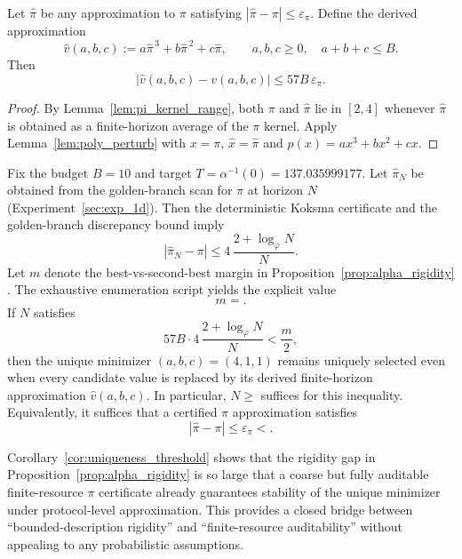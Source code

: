 \begin{corollary}
\label{cor:v_from_pi_certificate}
Let $\widehat\pi$ be any approximation to $\pi$ satisfying $|\widehat\pi-\pi|\le \varepsilon_\pi$.
Define the derived approximation
\[
\widehat v(a,b,c):=a\widehat\pi^{\,3}+b\widehat\pi^{\,2}+c\widehat\pi,
\qquad a,b,c\ge 0,\quad a+b+c\le B.
\]
Then
\[
|\widehat v(a,b,c)-v(a,b,c)|
\le 57B\,\varepsilon_\pi.
\]
\end{corollary}

\begin{proof}
By Lemma~\ref{lem:pi_kernel_range}, both $\pi$ and $\widehat\pi$ lie in $[2,4]$ whenever $\widehat\pi$ is obtained as a finite-horizon average of the $\pi$ kernel.
Apply Lemma~\ref{lem:poly_perturb} with $x=\pi$, $\widehat x=\widehat\pi$ and $p(x)=ax^3+bx^2+cx$.
\end{proof}

\begin{corollary}[A closed $N$-threshold guaranteeing uniqueness at budget $B=10$]
\label{cor:uniqueness_threshold}
Fix the budget $B=10$ and target $T=\alpha^{-1}(0)=137.035999177$.
Let $\widehat\pi_N$ be obtained from the golden-branch scan for $\pi$ at horizon $N$ (Experiment~\ref{sec:exp_1d}).
Then the deterministic Koksma certificate and the golden-branch discrepancy bound imply
\[
|\widehat\pi_N-\pi|
\le
4\,\frac{2+\log_\varphi N}{N}.
\]
Let $m$ denote the best-vs-second-best margin in Proposition~\ref{prop:alpha_rigidity}$.$
The exhaustive enumeration script  yields the explicit value
\[
m=.
\]
If $N$ satisfies
\[
57B\cdot 4\,\frac{2+\log_\varphi N}{N}<\frac{m}{2},
\]
then the unique minimizer $(a,b,c)=(4,1,1)$ remains uniquely selected even when every candidate value is replaced by its derived finite-horizon approximation $\widehat v(a,b,c)$.
In particular, $N\ge $ suffices for this inequality.
Equivalently, it suffices that a certified $\pi$ approximation satisfies
\[
|\widehat\pi-\pi| \le \varepsilon_\pi
< .
\]
\end{corollary}

\begin{remark}
Corollary~\ref{cor:uniqueness_threshold} shows that the rigidity gap in Proposition~\ref{prop:alpha_rigidity} is so large that a coarse but fully auditable finite-resource $\pi$ certificate already guarantees stability of the unique minimizer under protocol-level approximation.
This provides a closed bridge between ``bounded-description rigidity'' and ``finite-resource auditability'' without appealing to any probabilistic assumptions.
\end{remark}

